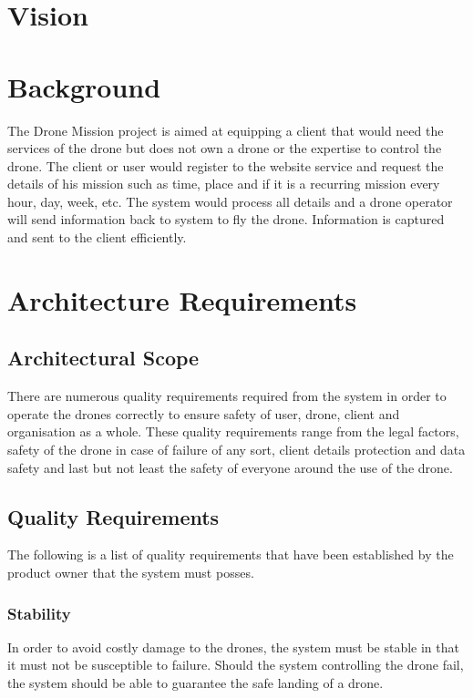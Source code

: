 \documentclass{article}
\begin{document}
	\section{Vision}%
	
	
	
	\section{Background} %
	The Drone Mission project is aimed at equipping a client that would need the services of the drone but does not own a drone or the expertise to control the drone. The client or user would register to the website service and request the details of his mission such as time, place and if it is a recurring mission every hour, day, week, etc. The system would process all details and a drone operator will send information back to system to fly the drone. Information is captured and sent to the client efficiently.
	\newpage
	
	\section{Architecture Requirements}%
		\subsection{Architectural Scope}%
			There are numerous quality requirements required from the system in order to operate the drones correctly to ensure safety of user, drone, client and organisation as a whole. These quality requirements range from the legal factors, safety of the drone in case of failure of any sort, client details protection and data safety and last but not least the safety of everyone around the use of the drone.
		
			\setlength{\leftskip}{45px}
				\lipsum[2]

		\subsection{Quality Requirements}%
			The following is a list of quality requirements that have been established by the product owner that the system must posses.
			\subsubsection{Stability}
				\setlength{\leftskip}{61px}
			 	In order to avoid costly damage to the drones, the system must be stable in that it must not be susceptible to failure. Should the system controlling the drone fail, the system should be able to guarantee the safe landing of a drone.
				
\end{document}
